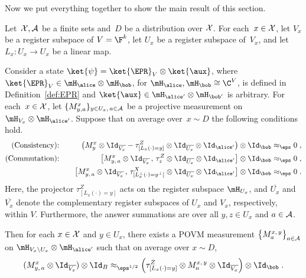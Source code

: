 Now we put everything together to show the main result of this section. 

\begin{lemma}
  \label{lem:mixing}
  Let~$\cal{X},\cal{A}$ be a finite sets and~$D$ be a distribution over
  $\cal{X}$.
  For each~$x \in \cal{X}$, let $V_x$ be a register subspace of $V = \F^k$, let
  $U_x$ be a register subspace of~$V_x$, and let $L_x:U_x \to U_x$ be a linear
  map.

  Consider a state $\ket{\psi} = \ket{\EPR}_V \otimes \ket{\aux}$, where
  $\ket{\EPR}_{V} \in \mH_\alice \otimes \mH_\bob$, for $\mH_\alice,\mH_\bob
  \cong \C^{V}$, is defined in Definition~\ref{def:EPR} and $\ket{\aux}\in
  \mH_{\alice'} \otimes \mH_{\bob'}$ is arbitrary.
  For each~$x \in \cal{X}$, let $\{M^{x}_{y,a}\}_{y \in U_x,\, a\in \cal{A}}$ be
  a projective measurement on $\mH_{V_x} \otimes \mH_{\alice'}$.
  Suppose that on average over~$x \sim D$ the following conditions hold.
  \begin{alignat*}{2}
    \text{(Consistency):} && \quad
    \bigl( M^{x}_{y} \otimes \Id_{\overline{V_x}} - \tau^Z_{[L_x(\cdot) = y]}
    \otimes \Id_{\overline{U_x}} \otimes \Id_{\alice'}\bigr) \otimes \Id_\bob
    \approx_\eps 0\;, &\\
    \text{(Commutation):} && \quad
      \bigl[ M^{x}_{y,\, a} \otimes \Id_{\overline{V_x}}\,,\, \tau^Z_{z} \otimes
      \Id_{\overline{U_x}}   \otimes \Id_{\alice'} \bigr] \otimes
      \Id_\bob\approx_\eps 0\;, &\\
      && \quad
      \bigl[ M^{x}_{y,\, a}\otimes \Id_{\overline{V_x}}\,,\,
      \tau^X_{[L_x^\perp(\cdot) = y^\perp]}  \otimes \Id_{\overline{U_x}}
      \otimes \Id_{\alice'} \bigr]  \otimes \Id_\bob  \approx_\eps 0\;.&
  \end{alignat*}
  Here, the projector $\tau^Z_{[L_x(\cdot) = y]}$ acts on the register subspace
  $\mH_{U_x}$, and $\overline{U_x}$ and $\overline{V_x}$ denote the
  complementary register subspaces of $U_x$ and $V_x$, respectively, within $V$. Furthermore, the answer summations are over all $y, z \in U_x$ and $a \in \cal{A}$.
  
  
  Then for each $x\in \cal{X}$ and $y \in U_x$, there exists a POVM measurement
  $\bigl\{ M^{x,\, y}_a \bigr\}_{a \in \cal{A}} $ on $\mH_{V_x \setminus
    U_x}\otimes \mH_{\alice'}$ such that on average over $x \sim D$,
  \begin{equation*}
    (M^{x}_{y,\, a} \otimes \Id_{\overline{V_x}}) \otimes \Id_{B}
    \approx_{\eps^{1/2}} \Bigl(\tau^Z_{[L_x(\cdot) = y]} \otimes M^{x,\, y}_a
    \otimes \Id_{\overline{V_x}}\Bigr) \otimes \Id_\bob\;.
  \end{equation*}
\end{lemma}

